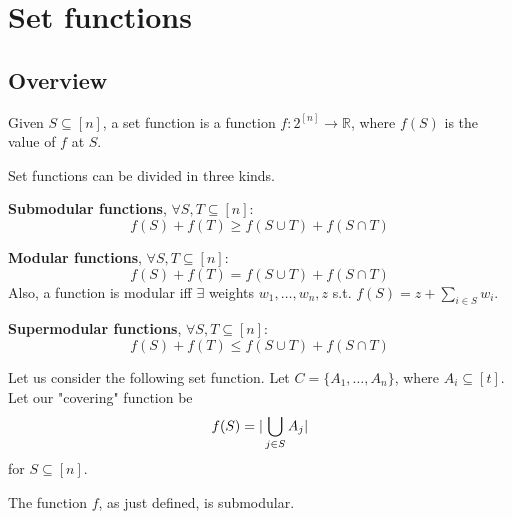 \section{Set functions}

\subsection{Overview}
    Given $S \subseteq [n]$, a set function is a function $f : 2^{[n]} \rightarrow \mathbb{R}$, where $f(S)$ is the value of $f$ at $S$.

    Set functions can be divided in three kinds.

    \textbf{Submodular functions}, $\forall S,T \subseteq [n]$:
    \[ f(S) + f(T) \geq f(S \cup T) + f(S \cap T) \]

    \textbf{Modular functions}, $\forall S,T \subseteq [n]$:
    \[ f(S) + f(T) = f(S \cup T) + f(S \cap T) \]
    Also, a function is modular iff $\exists$ weights $w_1, \dots, w_n, z$ s.t. $f(S) = z + \sum_{i \in S} w_i$.

    \textbf{Supermodular functions}, $\forall S,T \subseteq [n]$:
    \[ f(S) + f(T) \leq f(S \cup T) + f(S \cap T) \]

    Let us consider the following set function.
    Let $C = \{ A_1, \dots, A_n \}$, where $A_i \subseteq [t]$.
    Let our "covering" function be
    \[ f(S) = \vert \bigcup_{j \in S} A_j \vert \]
    for $S \subseteq [n]$.

    \begin{theorem}
        The function $f$, as just defined, is submodular.
    \end{theorem}

